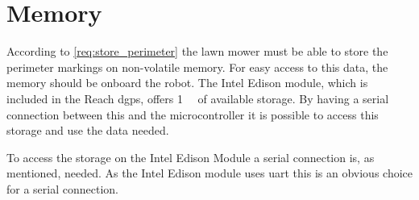 \section{Memory}
According to \autoref{req:store_perimeter} the lawn mower must be able to store the perimeter markings on non-volatile memory. For easy access to this data, the memory should be onboard the robot. The Intel Edison module, which is included in the Reach \gls{dgps}, offers \SI{1}{\giga\byte} of available storage. By having a serial connection between this and the microcontroller it is possible to access this storage and use the data needed.

To access the storage on the Intel Edison Module a serial connection is, as mentioned, needed. As the Intel Edison module uses \gls{uart} this is an obvious choice for a serial connection.

